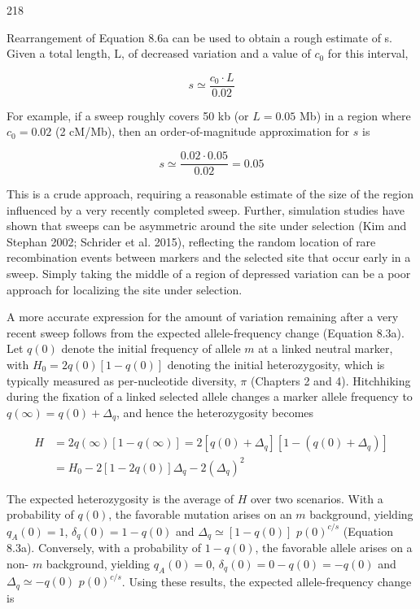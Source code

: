 \documentclass{article}
\begin{document}
218

Rearrangement of Equation 8.6a can be used to obtain a rough estimate of s. Given a total length, L, of decreased variation and a value of  $ c_{0} $ for this interval,

\begin{equation}
s\simeq\frac{c_{0}\cdot L}{0.02}
\tag{8.6b}
\label{eq:8_6b}
\end{equation}

For example, if a sweep roughly covers 50 kb (or  $ L = 0.05 $ Mb) in a region where  $ c_0 = 0.02 $ (2 cM/Mb), then an order-of-magnitude approximation for  $ s $ is

\begin{equation}
s\simeq\frac{0.02\cdot0.05}{0.02}=0.05
\end{equation}

This is a crude approach, requiring a reasonable estimate of the size of the region influenced by a very recently completed sweep. Further, simulation studies have shown that sweeps can be asymmetric around the site under selection (Kim and Stephan 2002; Schrider et al. 2015), reflecting the random location of rare recombination events between markers and the selected site that occur early in a sweep. Simply taking the middle of a region of depressed variation can be a poor approach for localizing the site under selection.

A more accurate expression for the amount of variation remaining after a very recent sweep follows from the expected allele-frequency change (Equation 8.3a). Let  $ q(0) $ denote the initial frequency of allele  $ m $ at a linked neutral marker, with  $ H_0 = 2q(0)[1 - q(0)] $ denoting the initial heterozygosity, which is typically measured as per-nucleotide diversity,  $ \pi $ (Chapters 2 and 4). Hitchhiking during the fixation of a linked selected allele changes a marker allele frequency to  $ q(\infty) = q(0) + \Delta_q $, and hence the heterozygosity becomes

\begin{equation}
\begin{aligned}H&=2q(\infty)[1-q(\infty)]=2[q(0)+\Delta_{q}][1-(q(0)+\Delta_{q})]\\&=H_{0}-2[1-2q(0)]\Delta_{q}-2\left(\Delta_{q}\right)^{2}\end{aligned}
\tag{8.7a}
\label{eq:8_7a}
\end{equation}

The expected heterozygosity is the average of  $ H $ over two scenarios. With a probability of  $ q(0) $, the favorable mutation arises on an  $ m $ background, yielding  $ q_A(0) = 1 $,  $ \delta_q(0) = 1 - q(0) $ and  $ \Delta_q \simeq [1 - q(0)] $  $ p(0)^{c/s} $ (Equation 8.3a). Conversely, with a probability of  $ 1 - q(0) $, the favorable allele arises on a non- $ m $ background, yielding  $ q_A(0) = 0 $,  $ \delta_q(0) = 0 - q(0) = -q(0) $ and  $ \Delta_q \simeq -q(0) $  $ p(0)^{c/s} $. Using these results, the expected allele-frequency change is
\end{document}

